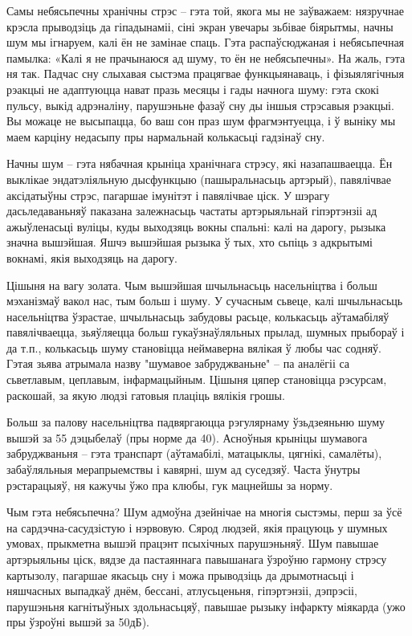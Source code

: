 Самы небясьпечны хранічны стрэс – гэта той, якога мы не заўважаем: нязручнае крэсла прыводзіць да гіпадынаміі, сіні экран увечары зьбівае біярытмы, начны шум мы ігнаруем, калі ён не замінае спаць. Гэта распаўсюджаная і небясьпечная памылка: «Калі я не прачынаюся ад шуму, то ён не небясьпечны». На жаль, гэта ня так. Падчас сну слыхавая сыстэма працягвае функцыянаваць, і фізыялягічныя рэакцыі не адаптуюцца нават празь месяцы і гады начнога шуму: гэта скокі пульсу, выкід адрэналіну, парушэньне фазаў сну ды іншыя стрэсавыя рэакцыі. Вы можаце не высыпацца, бо ваш сон праз шум фрагмэнтуецца, і ў выніку мы маем карціну недасыпу пры нармальнай колькасьці гадзінаў сну.

Начны шум – гэта нябачная крыніца хранічнага стрэсу, які назапашваецца. Ён выклікае эндатэліяльную дысфункцыю (пашыральнасьць артэрый), павялічвае аксідатыўны стрэс, пагаршае імунітэт і павялічвае ціск. У шэрагу дасьледаваньняў паказана залежнасьць частаты артэрыяльнай гіпэртэнзіі ад ажыўленасьці вуліцы, куды выходзяць вокны спальні: калі на дарогу, рызыка значна вышэйшая. Яшчэ вышэйшая рызыка ў тых, хто сьпіць з адкрытымі вокнамі, якія выходзяць на дарогу.

Цішыня на вагу золата. Чым вышэйшая шчыльнасьць насельніцтва і больш мэханізмаў вакол нас, тым больш і шуму. У сучасным сьвеце, калі шчыльнасьць насельніцтва ўзрастае, шчыльнасьць забудовы расьце, колькасьць аўтамабіляў павялічваецца, зьяўляецца больш гукаўзнаўляльных прылад, шумных прыбораў і да т.п., колькасьць шуму становіцца неймаверна вялікая ў любы час содняў. Гэтая зьява атрымала назву "шумавое забруджваньне" – па аналёгіі са сьветлавым, цеплавым, інфармацыйным. Цішыня цяпер становіцца рэсурсам, раскошай, за якую людзі гатовыя плаціць вялікія грошы.

Больш за палову насельніцтва падвяргаюцца рэгулярнаму ўзьдзеяньню шуму вышэй за 55 дэцыбелаў (пры норме да 40). Асноўныя крыніцы шумавога забруджваньня – гэта транспарт (аўтамабілі, матацыклы, цягнікі, самалёты), забаўляльныя мерапрыемствы і кавярні, шум ад суседзяў. Часта ўнутры рэстарацыяў, ня кажучы ўжо пра клюбы, гук мацнейшы за норму.

Чым гэта небясьпечна? Шум адмоўна дзейнічае на многія сыстэмы, перш за ўсё на сардэчна-сасудзістую і нэрвовую. Сярод людзей, якія працуюць у шумных умовах, прыкметна вышэй працэнт псыхічных парушэньняў. Шум павышае артэрыяльны ціск, вядзе да пастаяннага павышанага ўзроўню гармону стрэсу картызолу, пагаршае якасьць сну і можа прыводзіць да дрымотнасьці і няшчасных выпадкаў днём, бессані, атлусьценьня, гіпэртэнзіі, дэпрэсіі, парушэньня кагнітыўных здольнасьцяў, павышае рызыку інфаркту міякарда (ужо пры ўзроўні вышэй за 50дБ).

